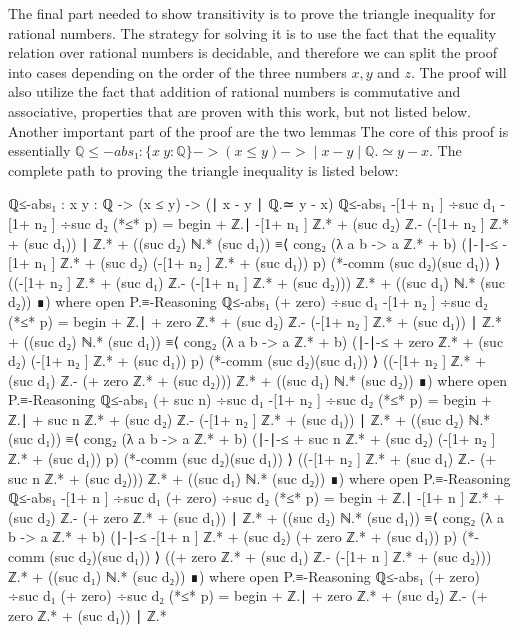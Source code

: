 \documentclass[11pt,a4paper]{article}
\begin{document}
The final part needed to show transitivity is to prove the triangle inequality for rational numbers. The strategy for solving it is to use the fact that the equality relation over rational numbers is decidable, and therefore we can split the proof into cases depending on the order of the three numbers $x, y$ and $z$. The proof will also utilize the fact that addition of rational numbers is commutative and associative, properties that are proven with this work, but not listed below. Another important part of the proof are the two lemmas The core of this proof is essentially $ℚ≤-abs₁ : \{x\ y : ℚ\} -> (x ≤ y) -> ∣ x - y ∣ ℚ.≃ y - x$. The complete path to proving the triangle inequality is listed below:
\begin{code}
ℚ≤-abs₁ : {x y : ℚ} -> (x ≤ y) -> (∣ x - y ∣ ℚ.≃ y - x)
ℚ≤-abs₁ { -[1+ n₁ ] ÷suc d₁} { -[1+ n₂ ] ÷suc d₂} (*≤* p) = begin
    + ℤ.∣ -[1+ n₁ ] ℤ.* + (suc d₂) ℤ.- (-[1+  n₂ ] ℤ.* + (suc d₁)) ∣
    ℤ.* + ((suc d₂) ℕ.* (suc d₁)) ≡⟨ cong₂ (λ a b -> a ℤ.* + b)
    (∣-∣-≤ { -[1+ n₁ ] ℤ.* + (suc d₂)}{ (-[1+  n₂ ] ℤ.* + (suc d₁))} p)
    (*-comm (suc d₂)(suc d₁)) ⟩
  ((-[1+  n₂ ] ℤ.* + (suc d₁) ℤ.- (-[1+ n₁ ] ℤ.* + (suc d₂))) ℤ.*
  + ((suc d₁) ℕ.* (suc d₂)) ∎)
     where
     open P.≡-Reasoning
ℚ≤-abs₁ {(+ zero) ÷suc d₁} { -[1+ n₂ ] ÷suc d₂} (*≤* p) = begin
    + ℤ.∣ + zero ℤ.* + (suc d₂) ℤ.- (-[1+  n₂ ] ℤ.* + (suc d₁)) ∣
    ℤ.* + ((suc d₂) ℕ.* (suc d₁)) ≡⟨ cong₂ (λ a b -> a ℤ.* + b)
    (∣-∣-≤ { + zero ℤ.* + (suc d₂)}{ (-[1+  n₂ ] ℤ.* + (suc d₁))} p)
    (*-comm (suc d₂)(suc d₁)) ⟩
  ((-[1+  n₂ ] ℤ.* + (suc d₁) ℤ.- (+ zero ℤ.* + (suc d₂))) ℤ.*
  + ((suc d₁) ℕ.* (suc d₂)) ∎)
     where
     open P.≡-Reasoning
ℚ≤-abs₁ {(+ suc n) ÷suc d₁} { -[1+ n₂ ] ÷suc d₂} (*≤* p) = begin
    + ℤ.∣ + suc n ℤ.* + (suc d₂) ℤ.- (-[1+  n₂ ] ℤ.* + (suc d₁))
    ∣ ℤ.* + ((suc d₂) ℕ.* (suc d₁)) ≡⟨ cong₂ (λ a b -> a ℤ.* + b)
    (∣-∣-≤ { + suc n ℤ.* + (suc d₂)}{ (-[1+  n₂ ] ℤ.* + (suc d₁))} p)
    (*-comm (suc d₂)(suc d₁)) ⟩
  ((-[1+  n₂ ] ℤ.* + (suc d₁) ℤ.- (+ suc n ℤ.* + (suc d₂))) ℤ.*
  + ((suc d₁) ℕ.* (suc d₂)) ∎)
     where
     open P.≡-Reasoning
ℚ≤-abs₁ { -[1+ n ] ÷suc d₁} {(+ zero) ÷suc d₂} (*≤* p) = begin
    + ℤ.∣ -[1+ n ] ℤ.* + (suc d₂) ℤ.- (+ zero ℤ.* + (suc d₁)) ∣
    ℤ.* + ((suc d₂) ℕ.* (suc d₁)) ≡⟨ cong₂ (λ a b -> a ℤ.* + b)
    (∣-∣-≤ { -[1+ n ] ℤ.* + (suc d₂)}{ (+ zero ℤ.* + (suc d₁))} p)
    (*-comm (suc d₂)(suc d₁)) ⟩
  ((+ zero ℤ.* + (suc d₁) ℤ.- (-[1+ n ] ℤ.* + (suc d₂))) ℤ.*
  + ((suc d₁) ℕ.* (suc d₂)) ∎)
     where
     open P.≡-Reasoning
ℚ≤-abs₁ {(+ zero) ÷suc d₁} {(+ zero) ÷suc d₂} (*≤* p) = begin
    + ℤ.∣ + zero ℤ.* + (suc d₂) ℤ.- (+ zero ℤ.* + (suc d₁)) ∣ ℤ.*

\end{code}
\end{document}

